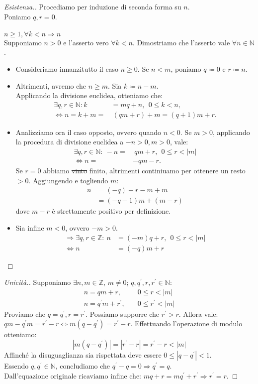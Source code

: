 \documentclass[12pt,twoside]{article}
\newcommand{\N}{\mathbb{N}}
\newcommand{\Z}{\mathbb{Z}}
\newcommand{\sesolose}{\Leftrightarrow}
\newcommand{\implica}{\Longrightarrow}
\newcommand{\nin}{\forall n\in\N}
\newcommand{\pr}{\prime}
\renewcommand\qedsymbol{$\blacksquare$}
\newcommand{\baseinduz}[1]{\newline\newline {\boldmath$n = #1$}}
\newcommand{\induzdue}[1]{\\\\{\boldmath$n \ge #1, \forall k < n \implica n$}}
\begin{document}
\renewcommand\qedsymbol{$\square$}
\begin{proof}[Esistenza.]
Procediamo per induzione di seconda forma su $n$.
\baseinduz{0}
\\Poniamo $q, r = 0$.
\induzdue{1}
\\Supponiamo $n > 0$ e l'asserto vero $\forall k < n$. Dimostriamo che l'asserto vale $\nin$.
\begin{itemize}
\item Consideriamo innanzitutto il caso $n \ge 0$. Se $n < m$, poniamo $q \coloneqq 0$ e $ r \coloneqq n$.
\item Altrimenti, avremo che $n \ge m$. Sia $k \coloneqq n - m$.\\Applicando la divisione euclidea, otteniamo che:
\begin{align*}
\exists q, r \in \N : k &= mq + n, \ \ 0 \le k <n, \\
\sesolose n = k + m =&\ (qm + r) + m = (q+1) m + r.
\end{align*}
\item Analizziamo ora il caso opposto, ovvero quando $n < 0$. Se $m > 0$, applicando la procedura di divisione euclidea a $-n > 0, m >0$, vale:
\begin{align*}
\exists q, r \in \N:\ -n =&  \ qm + r, \ \ 0 \le r < |m| \\
\sesolose n =& - qm - r.
\end{align*}
Se $ r = 0$ abbiamo \sout{vinto} finito, altrimenti continiuamo per ottenere un resto $> 0$. Aggiungendo e togliendo $m$:
\begin{align*}
n &= (-q)-r-m+m \\
&= (-q-1)m+(m-r)
\end{align*}
dove $m-r$ è strettamente positivo per definizione.
\item Sia infine $m < 0$, ovvero $-m > 0$.
\begin{align*}
\implica \exists q, r \in \Z:\ n &= (-m)q + r, \ \ 0 \le r < |m| \\
 \sesolose n &= (-q)m + r 
\end{align*}
\end{itemize}
\end{proof}
\renewcommand\qedsymbol{$\blacksquare$}
\begin{proof}[Unicità.]
Supponiamo $\exists n, m \in \Z$, $m \ne 0$; $q, q^{\pr}, r, r^{\pr} \in \N$:
\begin{align*}
n = qm + r,& \quad 0 \le r < |m| \\
n = q^{\pr}m + r^{\pr},& \quad 0 \le r^{\pr} < |m|
\end{align*}
Proviamo che $ q = q^{\pr}, r = r^{\pr}$. Possiamo supporre che $r^{\pr} > r$. Allora vale:
\\$ qm - q^{\pr}m = r^{\pr} - r \sesolose m(q-q^{\pr}) = r^{\pr}-r$. Effettuando l'operazione di modulo otteniamo:
$$ |m(q-q^{\pr})| = |r^{\pr} - r| = r^{\pr} - r < |m|$$
Affinché la disuguaglianza sia rispettata deve essere $ 0 \le |q-q^{\pr}| < 1 $.
\\ Essendo $q, q^{\pr} \in \N$, concludiamo che $q^{\pr} - q = 0 \implica q^{\pr} = q$.
\\ Dall'equazione originale ricaviamo infine che: $mq + r = mq^{\pr} + r^{\pr} \implica r^{\pr} = r$.
\end{proof}
\end{document}
